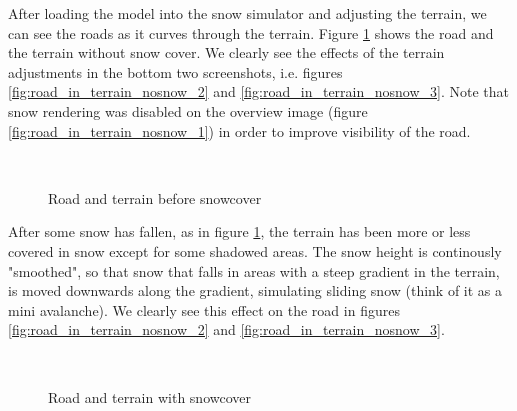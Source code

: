 
After loading the model into the snow simulator and adjusting the terrain, we can see the roads as it curves through the terrain. Figure \ref{fig:road_in_terrain_nosnow} shows the road and the terrain without snow cover. We clearly see the effects of the terrain adjustments in the bottom two screenshots, i.e. figures \ref{fig:road_in_terrain_nosnow_2} and \ref{fig:road_in_terrain_nosnow_3}. Note that snow rendering was disabled on the overview image (figure \ref{fig:road_in_terrain_nosnow_1}) in order to improve visibility of the road. 

\begin{figure}[ht]
\centering
{}\\
\quad
{}
\caption{Road and terrain before snowcover}
\label{fig:road_in_terrain_nosnow}
\end{figure}

After some snow has fallen, as in figure \ref{fig:road_in_terrain_nosnow}, the terrain has been more or less covered in snow except for some shadowed areas. The snow height is continously "smoothed", so that snow that falls in areas with a steep gradient in the terrain, is moved downwards along the gradient, simulating sliding snow (think of it as a mini avalanche). We clearly see this effect on the road in figures \ref{fig:road_in_terrain_nosnow_2} and \ref{fig:road_in_terrain_nosnow_3}.

\begin{figure}[ht]
\centering
{}\\
\quad
{}
\caption{Road and terrain with snowcover}
\label{fig:road_in_terrain_snow}
\end{figure}

